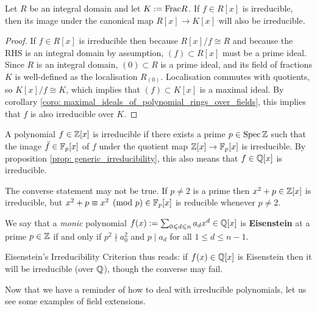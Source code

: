         \begin{proposition} \label{prop: generic_irreducibility}
            Let $R$ be an integral domain and let $K := \mathrm{Frac} R$. If $f \in R[x]$ is irreducible, then its image under the canonical map $R[x] \to K[x]$ will also be irreducible.
        \end{proposition}
            \begin{proof}
                If $f \in R[x]$ is irreducible then because $R[x]/f \cong R$ and because the RHS is an integral domain by assumption, $(f) \subset R[x]$ must be a prime ideal. Since $R$ is an integral domain, $(0) \subset R$ is a prime ideal, and its field of fractions $K$ is well-defined as the localisation $R_{(0)}$. Localisation commutes with quotients, so $K[x]/f \cong K$, which implies that $(f) \subset K[x]$ is a maximal ideal. By corollary \ref{coro: maximal_ideals_of_polynomial_rings_over_fields}, this implies that $f$ is also irreducible over $K$.
            \end{proof}
        \begin{example} \label{example: irreducibility_modulo_p}
            A polynomial $f \in \mathbb{Z}[x]$ is irreducible if there exists a prime $p \in \operatorname{Spec} \mathbb{Z}$ such that the image $\bar{f} \in \mathbb{F}_p[x]$ of $f$ under the quotient map $\mathbb{Z}[x] \to \mathbb{F}_p[x]$ is irreducible. By proposition \ref{prop: generic_irreducibility}, this also means that $f \in \mathbb{Q}[x]$ is irreducible.

            The converse statement may not be true. If $p \not = 2$ is a prime then $x^2 + p \in \mathbb{Z}[x]$ is irreducible, but $x^2 + p \equiv x^2 \pmod{p} \in \mathbb{F}_p[x]$ is reducible whenever $p \not = 2$.
        \end{example}

        \begin{definition} \label{def: eisenstein_polynomials}
            We say that a \textit{monic} polynomial $f(x) := \sum_{0 \leqslant d \leqslant n} a_d x^d \in \mathbb{Q}[x]$ is \textbf{Eisenstein} at a prime $p \in \mathbb{Z}$ if and only if $p^2 \nmid a_0^2$ and $p \mid a_d$ for all $1 \leq d \leq n - 1$.
            
            Eisenstein's Irreducibility Criterion thus reads: if $f(x) \in \mathbb{Q}[x]$ is Eisenstein then it will be irreducible (over $\mathbb{Q}$), though the converse may fail.
        \end{definition}

        Now that we have a reminder of how to deal with irreducible polynomials, let us see some examples of field extensions.
        
